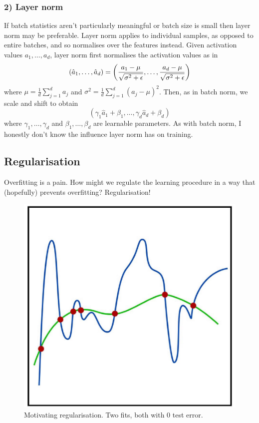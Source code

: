 \documentclass[11pt]{article}
\begin{document}
\subsubsection*{2) Layer norm}
If batch statistics aren't particularly meaningful or batch size is small then layer norm may be preferable. Layer norm applies to individual samples, as opposed to entire batches, and so normalises over the features instead. Given activation values $a_1,\dots,a_d$, layer norm first normalises the activation values as in
$$
(\hat{a}_1,\dots,\hat{a}_d)
=
\left(\frac{a_1-\mu}{\sqrt{\sigma^2+\epsilon}},\dots,\frac{a_d-\mu}{\sqrt{\sigma^2+\epsilon}}\right)
$$
where $\mu=\frac{1}{d}\sum_{j=1}^da_j$ and $\sigma^2=\frac{1}{d}\sum_{j=1}^d(a_j-\mu)^2$. Then, as in batch norm, we scale and shift to obtain
$$
(\gamma_1\hat{a}_1+\beta_1,\dots,\gamma_d\hat{a}_d+\beta_d)
$$
where $\gamma_1,\dots,\gamma_d$ and $\beta_1,\dots,\beta_d$ are learnable parameters. As with batch norm, I honestly don't know the influence layer norm has on training.

\subsection{Regularisation}
Overfitting is a pain. How might we regulate the learning procedure in a way that (hopefully) prevents overfitting? Regularisation!

\begin{figure}[t]
    \centering
    \begin{minipage}{0.4\linewidth}
        \includegraphics[width=1\linewidth]{./figures/supervised_learning/regularisation_two_plots_zero_test_error.pdf}
    \end{minipage}%
    \hfill
    \begin{minipage}{0.55\linewidth}
        \caption{Motivating regularisation. Two fits, both with 0 test error.}
        \label{fig:regularisation_two_plots}
    \end{minipage}
\end{figure}
\end{document}
